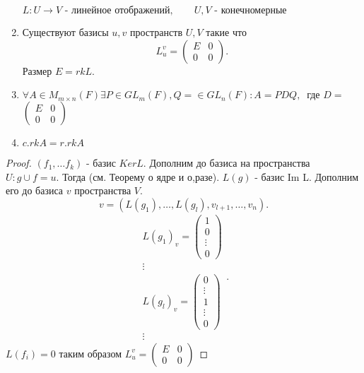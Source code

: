 \documentclass[12pt]{report}
\begin{document}
\begin{thm}
    \begin{enumerate}
    $L: U \to V \mbox{ - линейное отображений}, \qquad U, V \mbox{ - конечномерные}$
\item Существуют базисы $u, v$ пространств $U, V$ такие что \[
   L_u ^v = 
\left ( 
\begin{array}{cc}
	E & 0 \\
	0 & 0
\end{array}
\right )
   .\]  
   Размер $E = rk L$.
   \item $\forall A \in M_{m \times n} (F) \exists  P \in GL_m (F), Q = \in GL_n (F): A = P D Q, \: \mbox{ где } D =  $
$\left ( \begin{array}{cc}
    E & 0 \\ 0 & 0
\end{array}
\right )
       $
   \item $c. rk A = r. rk A$
    \end{enumerate}
\end{thm}
\begin{proof}
    $(f_1, \ldots f_k) $ - базис $Ker L$. Дополним до базиса на пространства $U: g \cup f = u $. Тогда (см. Теорему о ядре и о,разе).  $L(g)$ - базис Im L. Дополним его до базиса  $v$ пространства $V$.
    \[
	v = (L(g_1), \ldots , L(g_l), v_{l+1}, \ldots, v_n)
    .\]
    \[
	\begin{array}{l}
	L(g_1)_v = 
	\left ( 
	\begin{array}{c}
	1 \\ 0 \\ \vdots \\ 0
	\end{array}
	\right ) \\
	\vdots \\
	L(g_l)_v = 
	\left ( 
	\begin{array}{c}
	0 \\ \vdots \\ 1 \\ \vdots \\ 0
	\end{array}
	\right )\\
	\vdots
    \end{array}
    .\] 
    $L(f_i) = 0$
    таким образом $L_u ^v = %
\left ( 
\begin{array}{cc}
	E & 0 \\
	0 & 0
\end{array}
\right )
    $
\end{proof}
\end{document}

